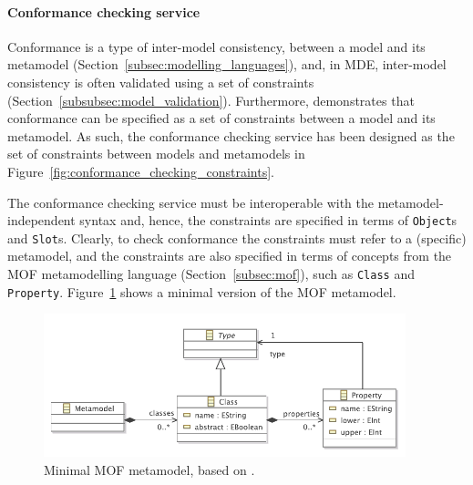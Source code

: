 \paragraph{Conformance checking service} Conformance is a type of inter-model consistency, between a model and its metamodel (Section~\ref{subsec:modelling_languages}), and, in MDE, inter-model consistency is often validated using a set of constraints (Section~\ref{subsubsec:model_validation}). Furthermore, \cite{paige07metamodel} demonstrates that conformance can be specified as a set of constraints between a model and its metamodel. As such, the conformance checking service has been designed as the set of constraints between models and metamodels in Figure~\ref{fig:conformance_checking_constraints}.

The conformance checking service must be interoperable with the metamodel-independent syntax and, hence, the constraints are specified in terms of \texttt{Ob\-je\-ct}s and \texttt{Sl\-ot}s. Clearly, to check conformance the constraints must refer to a (specific) metamodel, and the constraints are also specified in terms of concepts from the MOF metamodelling language (Section~\ref{subsec:mof}), such as \texttt{Class} and \texttt{Property}. Figure~\ref{fig:minimal_mof} shows a minimal version of the MOF metamodel.

\begin{figure}[p]
  \centering
  \includegraphics[width=10.5cm]{5.Implementation/images/minimal_mof.pdf}
  \caption{Minimal MOF metamodel, based on \cite{mof}.}
  \label{fig:minimal_mof}
\end{figure}

